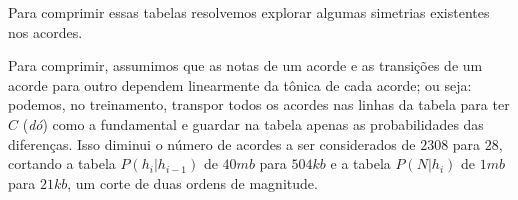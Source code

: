 \documentclass{article}
\begin{document}
Para comprimir essas tabelas resolvemos explorar algumas simetrias
existentes nos acordes.

Para comprimir, assumimos que as notas de um acorde e as transições de
um acorde para outro dependem linearmente da tônica de cada acorde; ou
seja: podemos, no treinamento, transpor todos os acordes nas linhas da
tabela para ter $C$ (\textit{dó}) como a fundamental e guardar na
tabela apenas as probabilidades das diferenças. Isso diminui o número
de acordes a ser considerados de $2308$ para $28$, cortando a tabela
$P(h_i|h_{i-1})$ de $40mb$ para $504kb$ e a tabela $P(N|h_i)$ de $1mb$
para $21kb$, um corte de duas ordens de magnitude.
\end{document}
